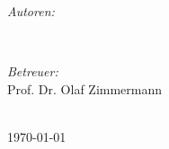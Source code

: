 \begin{titlepage}
\begin{minipage}{0.45\textwidth}
\begin{flushleft} \large
\emph{Autoren:}\\
\@author
\end{flushleft}
\end{minipage}
~
\begin{minipage}{0.45\textwidth}
\begin{flushright} \large
\emph{Betreuer:} \\
Prof. Dr. Olaf Zimmermann \\[1.2em] %
\end{flushright}
\end{minipage}\\[0.7cm]

\vspace{0.2cm}
{\large \today}\\[1cm] %

\vfill %

\end{titlepage}